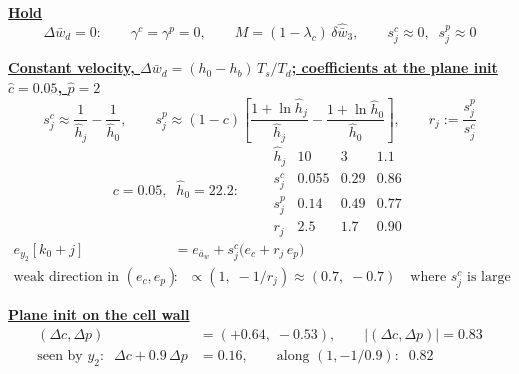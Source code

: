 \documentclass[11pt,a4paper]{ctexart}
\newcommand{\lc}{\lambda_c}
\newcommand{\ba}{\bar{a}}
\newcommand{\bw}{\bar{w}}
\newcommand{\dW}{\Delta\bw}
\newcommand{\wh}{\hat{\bw}}
\newcommand{\hh}{\hat{h}}
\newcommand{\ch}{\hat{c}}
\newcommand{\ph}{\hat{p}}
\newcommand{\hd}[1]{\par\bigskip\noindent\underline{\textbf{#1}}}
\begin{document}
\hd{Hold}
\[
\dW_d = 0:\qquad \gamma^{c} = \gamma^{p} = 0, \qquad M = (1-\lc)\,\delta\wh_3, \qquad s^{c}_j \approx 0,\;\; s^{p}_j \approx 0
\]

\hd{Constant velocity, $\dW_d = (h_0 - h_b)\,T_s/T_d$; coefficients at the plane init $\ch = 0.05$, $\ph = 2$}
\[
s^{c}_j \approx \frac{1}{\hh_j} - \frac{1}{\hh_0}, \qquad
s^{p}_j \approx (1-c)\left[\frac{1 + \ln\hh_j}{\hh_j} - \frac{1 + \ln\hh_0}{\hh_0}\right], \qquad
r_j := \frac{s^{p}_j}{s^{c}_j}
\]
\[
c = 0.05,\;\; \hh_0 = 22.2:\qquad
\begin{array}{c|ccc}
\hh_j & 10 & 3 & 1.1 \\ \hline
s^{c}_j & 0.055 & 0.29 & 0.86 \\
s^{p}_j & 0.14 & 0.49 & 0.77 \\
r_j & 2.5 & 1.7 & 0.90
\end{array}
\]
\[
\begin{aligned}
e_{y_2}[k_0+j] &= e_{\ba_w} + s^{c}_j\big(e_c + r_j\,e_p\big) \\
\text{weak direction in } (e_c, e_p)&:\;\; \propto (1,\; -1/r_j) \approx (0.7,\; -0.7) \quad \text{where } s^{c}_j \text{ is large}
\end{aligned}
\]

\hd{Plane init on the cell wall}
\[
\begin{aligned}
(\Delta c, \Delta p) &= (+0.64,\; -0.53), \qquad |(\Delta c, \Delta p)| = 0.83 \\
\text{seen by } y_2:\;\; \Delta c + 0.9\,\Delta p &= 0.16, \qquad \text{along } (1, -1/0.9):\;\; 0.82
\end{aligned}
\]
\end{document}

